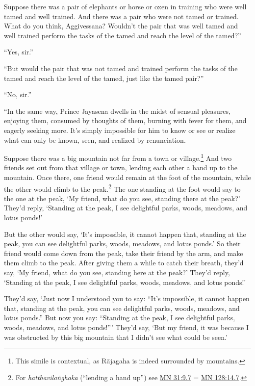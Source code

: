 \documentclass[12pt,openany]{book}%
\begin{document}
Suppose there was a pair of elephants or horse or oxen in training who were well tamed and well trained. And there was a pair who were not tamed or trained. What do you think, Aggivessana? Wouldn’t the pair that was well tamed and well trained perform the tasks of the tamed and reach the level of the tamed?” 

“Yes, sir.” 

“But would the pair that was not tamed and trained perform the tasks of the tamed and reach the level of the tamed, just like the tamed pair?” 

“No, sir.” 

“In the same way, Prince Jayasena dwells in the midst of sensual pleasures, enjoying them, consumed by thoughts of them, burning with fever for them, and eagerly seeking more. It’s simply impossible for him to know or see or realize what can only be known, seen, and realized by renunciation. 

Suppose there was a big mountain not far from a town or village.\footnote{This simile is contextual, as \textsanskrit{Rājagaha} is indeed surrounded by mountains. } And two friends set out from that village or town, lending each other a hand up to the mountain. Once there, one friend would remain at the foot of the mountain, while the other would climb to the peak.\footnote{For \textit{\textsanskrit{hatthavilaṅghaka}} (“lending a hand up”) see \href{https://suttacentral.net/mn31/en/sujato\#9.7}{MN 31:9.7} = \href{https://suttacentral.net/mn128/en/sujato\#14.7}{MN 128:14.7}. } The one standing at the foot would say to the one at the peak, ‘My friend, what do you see, standing there at the peak?’ They’d reply, ‘Standing at the peak, I see delightful parks, woods, meadows, and lotus ponds!’ 

But the other would say, ‘It’s impossible, it cannot happen that, standing at the peak, you can see delightful parks, woods, meadows, and lotus ponds.’ So their friend would come down from the peak, take their friend by the arm, and make them climb to the peak. After giving them a while to catch their breath, they’d say, ‘My friend, what do you see, standing here at the peak?’ They’d reply, ‘Standing at the peak, I see delightful parks, woods, meadows, and lotus ponds!’ 

They’d say, ‘Just now I understood you to say: “It’s impossible, it cannot happen that, standing at the peak, you can see delightful parks, woods, meadows, and lotus ponds.” But now you say: “Standing at the peak, I see delightful parks, woods, meadows, and lotus ponds!”’ They’d say, ‘But my friend, it was because I was obstructed by this big mountain that I didn’t see what could be seen.’ 
\end{document}

